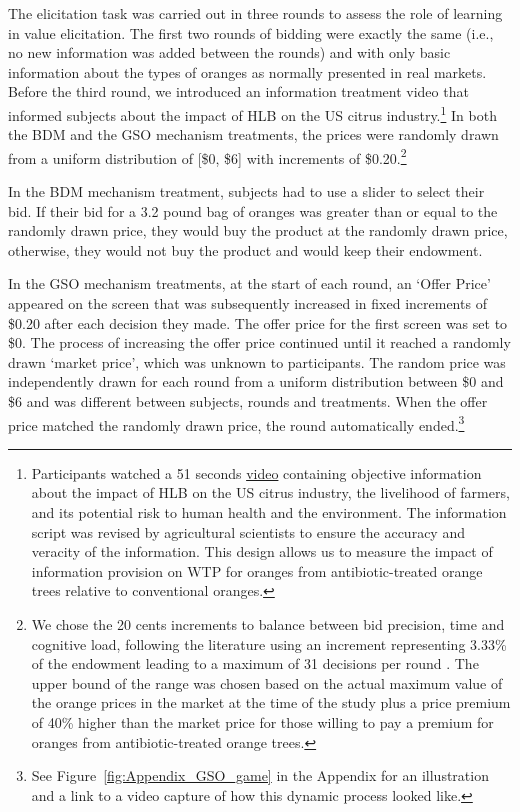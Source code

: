 \documentclass[12pt]{article}
\begin{document}
The elicitation task was carried out in three rounds to assess the role of learning \citep{corrigan2008testing, drichoutis2011role} in value elicitation. The first two rounds of bidding were exactly the same (i.e., no new information was added between the rounds) and with only basic information about the types of oranges as normally presented in real markets. Before the third round, we introduced an information treatment video that informed subjects about the impact of HLB on the US citrus industry.\footnote{Participants watched a 51 seconds \href{https://www.youtube.com/watch?v=_AqMBjB0ChM}{video} containing objective information about the impact of HLB on the US citrus industry, the livelihood of farmers, and its potential risk to human health and the environment. The information script was revised by agricultural scientists to ensure the accuracy and veracity of the information. This design allows us to measure the impact of information provision on WTP for oranges from antibiotic-treated orange trees relative to conventional oranges.} In both the BDM and the GSO mechanism treatments, the prices were randomly drawn from a uniform distribution of [\$0, \$6] with increments of \$0.20.\footnote{We chose the 20 cents increments to balance between bid precision, time and cognitive load, following the literature using an increment representing 3.33\% of the endowment leading to a maximum of 31 decisions per round \citep{li_obviously_2017, chakraborty_future_2025}. The upper bound of the range was chosen based on the actual maximum value of the orange prices in the market at the time of the study plus a price premium of 40\% higher than the market price for those willing to pay a premium for oranges from antibiotic-treated orange trees.}

In the BDM mechanism treatment, subjects had to use a slider to select their bid. If their bid for a 3.2 pound bag of oranges was greater than or equal to the randomly drawn price, they would buy the product at the randomly drawn price, otherwise, they would not buy the product and would keep their endowment.

In the GSO mechanism treatments, at the start of each round, an `Offer Price' appeared on the screen that was subsequently increased in fixed increments of \$0.20 after each decision they made. 
The offer price for the first screen was set to \$0. The process of increasing the offer price continued until it reached a randomly drawn `market price', which was unknown to participants. The random price was independently drawn for each round from a uniform distribution between \$0 and \$6 and was different between subjects, rounds and treatments. When the offer price matched the randomly drawn price, the round automatically ended.\footnote{See Figure~\ref{fig:Appendix_GSO_game} in the Appendix for an illustration and a link to a video capture of how this dynamic process looked like.} 
\end{document}
